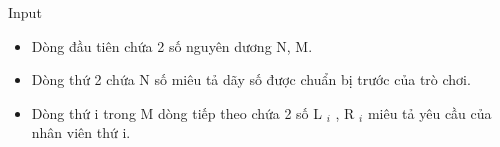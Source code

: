 Input
\begin{itemize}
	\item Dòng đầu tiên chứa 2 số nguyên dương N, M.
	\item Dòng thứ 2 chứa N số miêu tả dãy số được chuẩn bị trước của trò chơi.
	\item Dòng thứ i trong M dòng tiếp theo chứa 2 số L $_ i $ , R $_ i $ miêu tả yêu cầu của nhân viên thứ i.
\end{itemize}